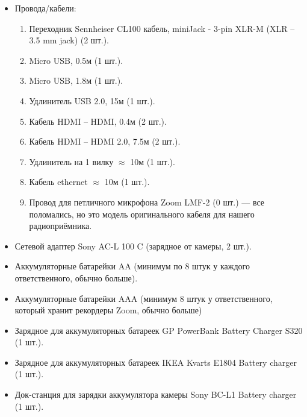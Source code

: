 \begin{itemize}[noitemsep]
  \item Провода/кабели:
        \begin{enumerate}
          \item Переходник \textsf{Sennheiser CL100 кабель, miniJack - 3-pin XLR-M} (XLR -- 3.5 mm jack) (2 шт.).
          \item \textsf{Micro USB}, 0.5м (1 шт.).
          \item \textsf{Micro USB}, 1.8м (1 шт.).
          \item Удлинитель \textsf{USB} 2.0, 15м (1 шт.).
          \item Кабель \textsf{HDMI -- HDMI}, 0.4м (2 шт.).
          \item Кабель \textsf{HDMI -- HDMI} 2.0, 7.5м (2 шт.).
          \item Удлинитель на 1 вилку $\approx$ 10м (1 шт.).
          \item Кабель \textsf{ethernet} $\approx$ 10м (1 шт.).
          \item Провод для петличного микрофона \textsf{Zoom LMF-2} (0 шт.) --- все поломались, но это модель оригинального кабеля для нашего радиоприёмника.
        \end{enumerate}\vspace{0.4\baselineskip}

  \item Сетевой адаптер \textsf{Sony AC-L 100 C} (зарядное от камеры, 2 шт.).
  \item Аккумуляторные батарейки \textsf{AA} (минимум по 8 штук у каждого ответственного, обычно больше).
  \item Аккумуляторные батарейки \textsf{AAA} (минимум 8 штук у ответственного, который хранит рекордеры \textsf{Zoom}, обычно больше)
  \item Зарядное для аккумуляторных батареек \textsf{GP PowerBank Battery Charger S320} (1 шт.).
  \item Зарядное для аккумуляторных батареек \textsf{IKEA Kvarts E1804 Battery charger} (1 шт.).
  \item Док-станция для зарядки аккумулятора камеры \textsf{Sony BC-L1 Battery charger} (1 шт.).
\end{itemize}
